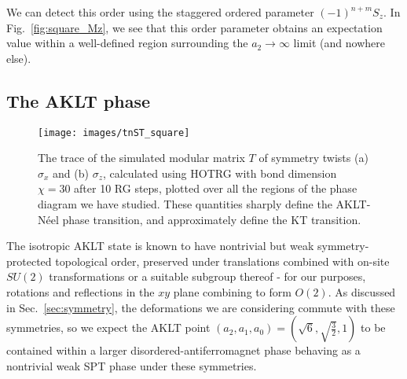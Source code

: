 \documentclass[aps,prb,letterpaper,superscriptaddress,twocolumn,showpacs,floatfix,10pt]{revtex4-1}
\begin{document}
We can detect this order using the staggered ordered parameter $(-1)^{n+m}S_z$.
In Fig.~\ref{fig:square_Mz}, we see that this order parameter obtains an
expectation value within a well-defined region surrounding the $a_2\to \infty$
limit (and nowhere else).

\subsection{The AKLT phase}
\label{sec:AKLT}

\begin{figure}[h!]
\texttt{[image: images/tnST\_square]}
\caption{ The trace of the simulated modular matrix $T$ of symmetry twists (a)
$\sigma_x$ and (b) $\sigma_z$, calculated using HOTRG with bond dimension
$\chi=30$ after 10 RG steps,
plotted over all the regions of the phase diagram we have studied.
These quantities sharply define the AKLT-N\'eel phase transition,
and approximately define the KT transition.}
  \label{fig:tnST_square}
\end{figure}
The isotropic AKLT state is known to have nontrivial but weak symmetry-protected
topological order, preserved under translations combined with on-site
$SU(2)$ transformations\cite{AKLTstrange,SREstrange,CZX} or a suitable subgroup
thereof - for our purposes,
rotations and reflections in the $xy$ plane combining to form $O(2)$.
As discussed in Sec.~\ref{sec:symmetry}, the deformations we are
considering commute with these symmetries, so we expect the AKLT point
$(a_2,a_1,a_0)=(\sqrt{6}, \sqrt{\frac{3}{2}},1 )$ to be contained within a
larger disordered-antiferromagnet phase behaving as a nontrivial weak SPT phase
under these symmetries.
\end{document}

